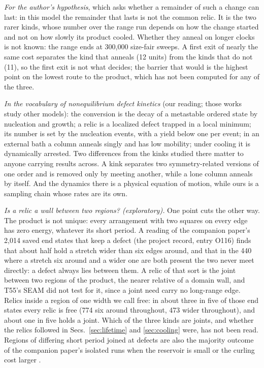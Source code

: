 \documentclass[aps,pre,10pt,twocolumn,superscriptaddress,nofootinbib]{revtex4-2}
\begin{document}
\emph{For the author's hypothesis}, which asks whether a remainder of such a change can last: in this model
the remainder that lasts is not the common relic. It is the two rarer kinds, whose number over the range run
depends on how the change started and not on how slowly its product cooled. Whether they anneal on longer
clocks is not known: the range ends at 300,000 size-fair sweeps. A first exit of nearly the same cost separates
the kind that anneals (12 units) from the kinds that do not (11), so the first exit is not what decides; the
barrier that would is the highest point on the lowest route to the product, which has not been computed for
any of the three.

\emph{In the vocabulary of nonequilibrium defect kinetics} \cite{JC26,JYC25,FZC26} (our reading; those works
study other models): the conversion is the decay of a metastable ordered state by nucleation and growth; a
relic is a localized defect trapped in a local minimum; its number is set by the nucleation events, with a
yield below one per event; in an external bath a column anneals singly and has low mobility; under cooling it
is dynamically arrested. Two differences from the kinks studied there matter to anyone carrying results
across. A kink separates two symmetry-related versions of one order and is removed only by meeting another,
while a lone column anneals by itself. And the dynamics there is a physical equation of motion, while ours is
a sampling chain whose rates are its own.

\emph{Is a relic a wall between two regions? (exploratory).} One point cuts the other way. The product is not
unique: every arrangement with two squares on every edge has zero energy, whatever its short period. A reading
of the companion paper's 2,014 saved end states that keep a defect (the project record, entry O116) finds that
about half hold a stretch wider than six edges around, and that in the 440 where a stretch six around and a
wider one are both present the two never meet directly: a defect always lies between them. A relic of that
sort is the joint between two regions of the product, the nearer relative of a domain wall, and T55's SEAM did
not test for it, since a joint need carry no long-range edge. Relics inside a region of one width we call free:
in about three in five of those end states every relic is free (774 six around throughout, 473 wider
throughout), and about one in five holds a joint. Which of the three kinds are joints, and whether
the relics followed in Secs.~\ref{sec:lifetime} and \ref{sec:cooling} were, has not been read. Regions of
differing short period joined at defects are also the majority outcome of the companion paper's isolated runs
when the reservoir is small or the curling cost larger \cite{paper1}.
\end{document}
